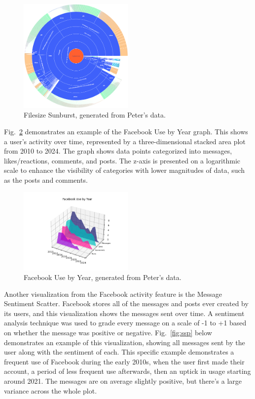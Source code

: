 \documentclass[conference, letterpaper, 11pt]{IEEEtran}
\begin{document}
\begin{figure}[htbp]
    \centering
    \includegraphics[width=0.5\textwidth]{img/fsb.png}
    \caption{Filesize Sunburst, generated from Peter's data.}
    \label{fig:fsb}
\end{figure}

Fig.~\ref{fig:fuy} demonstrates an example of the Facebook Use by Year graph. This shows a user's activity over time, represented by a three-dimensional stacked area plot from 2010 to 2024. The graph shows data points categorized into messages, likes/reactions, comments, and posts. The z-axis is presented on a logarithmic scale to enhance the visibility of categories with lower magnitudes of data, such as the posts and comments. 

\begin{figure}[htbp]
    \centering
    \includegraphics[width=0.5\textwidth]{img/fuy.png}
    \caption{Facebook Use by Year, generated from Peter's data.}
    \label{fig:fuy}
\end{figure}

Another visualization from the Facebook activity feature is the Message Sentiment Scatter. Facebook stores all of the messages and posts ever created by its users, and this visualization shows the messages sent over time. A sentiment analysis technique was used to grade every message on a scale of -1 to +1 based on whether the message was positive or negative. Fig.~\ref{fig:ssp} below demonstrates an example of this visualization, showing all messages sent by the user along with the sentiment of each. This specific example demonstrates a frequent use of Facebook during the early 2010s, when the user first made their account, a period of less frequent use afterwards, then an uptick in usage starting around 2021. The messages are on average slightly positive, but there's a large variance across the whole plot.
\end{document}
